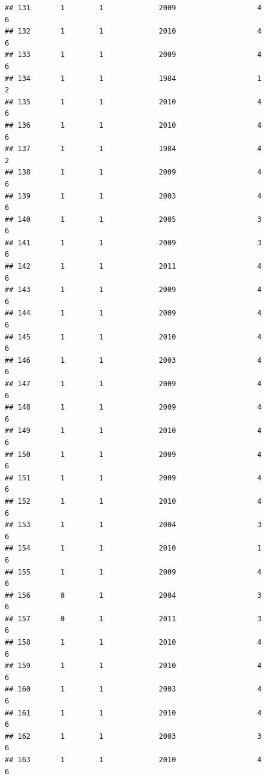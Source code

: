 \documentclass[
]{article}
\begin{document}
\begin{verbatim}
## 131       1        1             2009                   4                 6
## 132       1        1             2010                   4                 6
## 133       1        1             2009                   4                 6
## 134       1        1             1984                   1                 2
## 135       1        1             2010                   4                 6
## 136       1        1             2010                   4                 6
## 137       1        1             1984                   4                 2
## 138       1        1             2009                   4                 6
## 139       1        1             2003                   4                 6
## 140       1        1             2005                   3                 6
## 141       1        1             2009                   3                 6
## 142       1        1             2011                   4                 6
## 143       1        1             2009                   4                 6
## 144       1        1             2009                   4                 6
## 145       1        1             2010                   4                 6
## 146       1        1             2003                   4                 6
## 147       1        1             2009                   4                 6
## 148       1        1             2009                   4                 6
## 149       1        1             2010                   4                 6
## 150       1        1             2009                   4                 6
## 151       1        1             2009                   4                 6
## 152       1        1             2010                   4                 6
## 153       1        1             2004                   3                 6
## 154       1        1             2010                   1                 6
## 155       1        1             2009                   4                 6
## 156       0        1             2004                   3                 6
## 157       0        1             2011                   3                 6
## 158       1        1             2010                   4                 6
## 159       1        1             2010                   4                 6
## 160       1        1             2003                   4                 6
## 161       1        1             2010                   4                 6
## 162       1        1             2003                   3                 6
## 163       1        1             2010                   4                 6

\end{verbatim}
\end{document}
